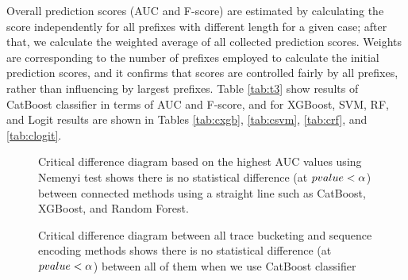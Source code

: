 Overall prediction scores (AUC and F-score) are estimated by calculating the score independently for all prefixes with different length for a given case; after that, we calculate the weighted average of all collected prediction scores.  Weights are corresponding to the number of prefixes employed to calculate the initial prediction scores, and it confirms that scores are controlled fairly by all prefixes, rather than influencing by largest prefixes. Table \ref{tab:t3} show results of CatBoost classifier in terms of AUC and F-score, and for XGBoost, SVM, RF, and Logit results are shown in Tables  \ref{tab:cxgb}, \ref{tab:csvm}, \ref{tab:crf}, and \ref{tab:clogit}. 
\begin{figure}[!htb]
	\begin{center}
		\caption[Comparison of all classification algorithms using the Nemenyi test]{Critical difference diagram based on the highest AUC values using Nemenyi test shows there is no statistical difference (at $p\-value < \alpha$) between connected methods using a straight line such as CatBoost, XGBoost, and Random Forest.}
		\label{fig:catn}
	\end{center}
\end{figure}


\begin{figure}[!htb]
	\begin{center}
		\caption[Comparison of all bucketing and encoding methods with CatBoost]{
			Critical difference diagram between all trace bucketing and sequence encoding methods shows there is no statistical difference (at $p\-value < \alpha$) between all of them when we use CatBoost classifier}
		\label{fig:cat3}
	\end{center}
\end{figure}


